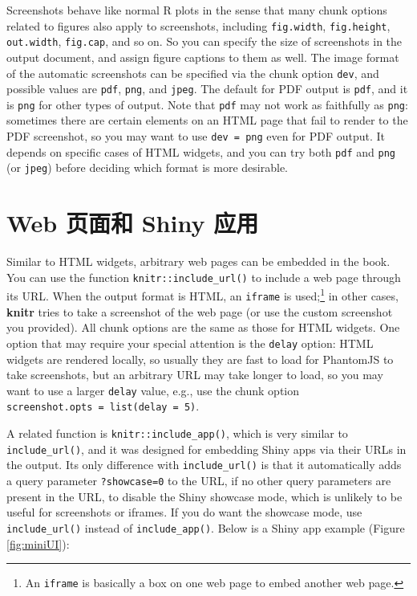 \documentclass[
  12pt,
]{krantz}
\theoremstyle{definition}
\theoremstyle{definition}
\theoremstyle{definition}
\theoremstyle{definition}
\theoremstyle{remark}
\begin{document}
Screenshots behave like normal R plots in the sense that many chunk options related to figures also apply to screenshots, including \texttt{fig.width}, \texttt{fig.height}, \texttt{out.width}, \texttt{fig.cap}, and so on. So you can specify the size of screenshots in the output document, and assign figure captions to them as well. The image format of the automatic screenshots can be specified via the chunk option \texttt{dev}, and possible values are \texttt{pdf}, \texttt{png}, and \texttt{jpeg}. The default for PDF output is \texttt{pdf}, and it is \texttt{png} for other types of output. Note that \texttt{pdf} may not work as faithfully as \texttt{png}: sometimes there are certain elements on an HTML page that fail to render to the PDF screenshot, so you may want to use \texttt{dev\ =\ \textquotesingle{}png\textquotesingle{}} even for PDF output. It depends on specific cases of HTML widgets, and you can try both \texttt{pdf} and \texttt{png} (or \texttt{jpeg}) before deciding which format is more desirable.

\hypertarget{web-ux9875ux9762ux548c-shiny-ux5e94ux7528}{%
\section{Web 页面和 Shiny 应用}\label{web-ux9875ux9762ux548c-shiny-ux5e94ux7528}}

Similar to HTML widgets, arbitrary web pages can be embedded in the book. You can use the function \texttt{knitr::include\_url()} to include a web page through its URL. When the output format is HTML, an \texttt{iframe} is used;\footnote{An \texttt{iframe} is basically a box on one web page to embed another web page.} in other cases, \textbf{knitr} tries to take a screenshot of the web page (or use the custom screenshot you provided). All chunk options are the same as those for HTML widgets. One option that may require your special attention is the \texttt{delay} option: HTML widgets are rendered locally, so usually they are fast to load for PhantomJS to take screenshots, but an arbitrary URL may take longer to load, so you may want to use a larger \texttt{delay} value, e.g., use the chunk option \texttt{screenshot.opts\ =\ list(delay\ =\ 5)}.

A related function is \texttt{knitr::include\_app()}, which is very similar to \texttt{include\_url()}, and it was designed for embedding Shiny apps via their URLs in the output. Its only difference with \texttt{include\_url()} is that it automatically adds a query parameter \texttt{?showcase=0} to the URL, if no other query parameters are present in the URL, to disable the Shiny showcase mode, which is unlikely to be useful for screenshots or iframes. If you do want the showcase mode, use \texttt{include\_url()} instead of \texttt{include\_app()}. Below is a Shiny app example (Figure \ref{fig:miniUI}):
\end{document}
